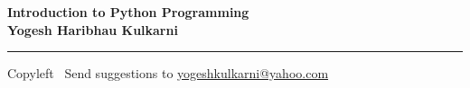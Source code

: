 
\graphicspath{{images/}}

\footnotesize


\begin{center}
\Large{\textbf{Introduction to Python Programming\\ Yogesh Haribhau Kulkarni}}  
\end{center}

\begin{multicols}{2}
	
\end{multicols}

\rule{\linewidth}{0.25pt}
\scriptsize
Copyleft \textcopyleft\  Send suggestions to 
\href{http://www.yogeshkulkarni.com}{yogeshkulkarni@yahoo.com}


